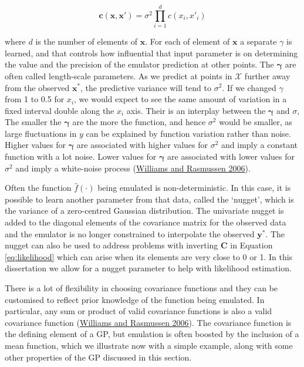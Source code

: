 \documentclass[
  12pt,
  a4paper,
  twoside]{book}
\begin{document}
\begin{equation}
\label{eq:mv-correlation}
\mathbf{c}(\mathbf{\mathbf{x}, \mathbf{x'}}) = \sigma^2 \prod_{i=1}^d c(x_i, x'_i)
\end{equation}

where \(d\) is the number of elements of \(\mathbf{x}\). For each of element of \(\mathbf{x}\) a separate \(\gamma\) is learned, and that controls how influential that input parameter is on determining the value and the precision of the emulator prediction at other points. The \(\mathbf{\gamma}\) are often called length-scale parameters. As we predict at points in \(\mathcal{X}\) further away from the observed \(\mathbf{x^*}\), the predictive variance will tend to \(\sigma^2\). If we changed \(\gamma\) from 1 to 0.5 for \(x_i\), we would expect to see the same amount of variation in a fixed interval double along the \(x_i\) axis. Their is an interplay between the \(\mathbf{\gamma}\) and \(\sigma\), The smaller the \(\mathbf{\gamma}\) are the more the function, and hence \(\sigma^2\) would be smaller, as large fluctuations in \(y\) can be explained by function variation rather than noise. Higher values for \(\mathbf{\gamma}\) are associated with higher values for \(\sigma^2\) and imply a constant function with a lot noise. Lower values for \(\mathbf{\gamma}\) are associated with lower values for \(\sigma^2\) and imply a white-noise process (\protect\hyperlink{ref-gp4ml}{Williams and Rasmussen 2006}).

Often the function \(\hat{f}(\cdot)\) being emulated is non-deterministic. In this case, it is possible to learn another parameter from that data, called the `nugget', which is the variance of a zero-centred Gaussian distribution. The univariate nugget is added to the diagonal elements of the covariance matrix for the observed data and the emulator is no longer constrained to interpolate the observed \(\mathbf{y^*}\). The nugget can also be used to address problems with inverting \(\mathbf{C}\) in Equation \eqref{eq:likelihood} which can arise when its elements are very close to 0 or 1. In this dissertation we allow for a nugget parameter to help with likelihood estimation.

There is a lot of flexibility in choosing covariance functions and they can be customised to reflect prior knowledge of the function being emulated. In particular, any sum or product of valid covariance functions is also a valid covariance function
(\protect\hyperlink{ref-gp4ml}{Williams and Rasmussen 2006}). The covariance function is the defining element of a GP, but emulation is often boosted by the inclusion of a mean function, which we illustrate now with a simple example, along with some other properties of the GP discussed in this section.
\end{document}

